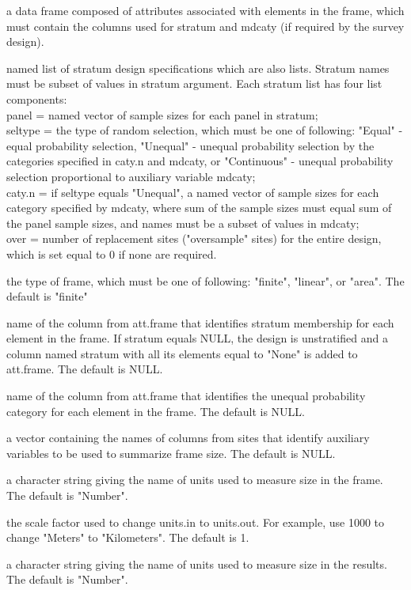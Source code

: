 \begin{Arguments}
\begin{ldescription}
\item[\code{att.frame}] a data frame composed of attributes associated with elements
in the frame, which must contain the columns used for stratum and mdcaty (if
required by the survey design).
\item[\code{design}] named list of stratum design specifications which are also
lists.  Stratum names must be subset of values in stratum argument.  Each
stratum list has four list components:\\
panel = named vector of sample sizes for each panel in stratum;\\
seltype = the type of random selection, which must be one of following:
"Equal" - equal probability selection, "Unequal" - unequal probability
selection by the categories specified in caty.n and mdcaty, or
"Continuous" - unequal probability selection proportional to auxiliary
variable mdcaty;\\
caty.n = if seltype equals "Unequal", a named vector of sample sizes for
each category specified by mdcaty, where sum of the sample sizes must
equal sum of the panel sample sizes, and names must be a subset of
values in mdcaty;\\
over = number of replacement sites ("oversample" sites) for the entire
design, which is set equal to 0 if none are required.
\item[\code{type.frame}] the type of frame, which must be one of following: "finite",
"linear", or "area".  The default is "finite"
\item[\code{stratum}] name of the column from att.frame that identifies stratum
membership for each element in the frame.  If stratum equals NULL, the
design is unstratified and a column named stratum with all its elements
equal to "None" is added to att.frame.  The default is NULL.
\item[\code{mdcaty}] name of the column from att.frame that identifies the unequal
probability category for each element in the frame.  The default is
NULL.
\item[\code{auxvar}] a vector containing the names of columns from sites that
identify auxiliary variables to be used to summarize frame size.  The
default is NULL.
\item[\code{units.in}] a character string giving the name of units used to measure
size in the frame.  The default is "Number".
\item[\code{scale}] the scale factor used to change units.in to units.out.  For
example, use 1000 to change "Meters" to "Kilometers".  The default is 1.
\item[\code{units.out}] a character string giving the name of units used to measure
size in the results.  The default is "Number".
\end{ldescription}
\end{Arguments}

